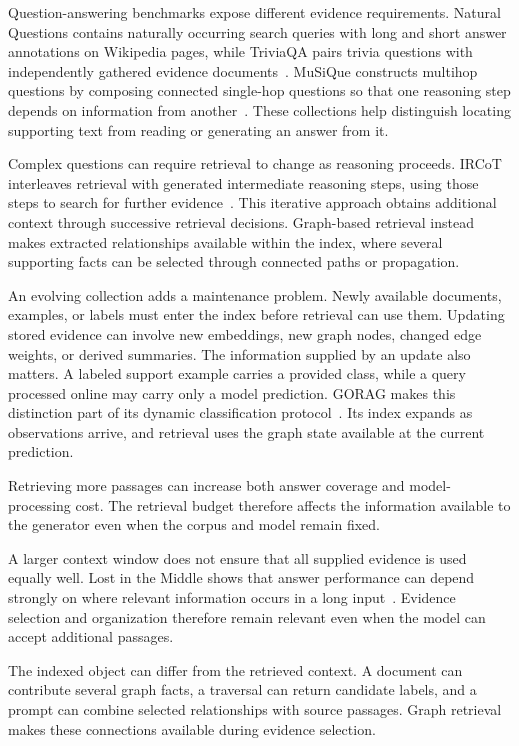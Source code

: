 Question-answering benchmarks expose different evidence requirements. Natural Questions contains naturally occurring search queries with long and short answer annotations on Wikipedia pages, while TriviaQA pairs trivia questions with independently gathered evidence documents~\cite{lit-kwiatkowski2019natural,lit-joshi2017triviaqa}. MuSiQue constructs multihop questions by composing connected single-hop questions so that one reasoning step depends on information from another~\cite{lit-trivedi2022musique}. These collections help distinguish locating supporting text from reading or generating an answer from it.

Complex questions can require retrieval to change as reasoning proceeds. IRCoT interleaves retrieval with generated intermediate reasoning steps, using those steps to search for further evidence~\cite{lit-trivedi2022interleaving}. This iterative approach obtains additional context through successive retrieval decisions. Graph-based retrieval instead makes extracted relationships available within the index, where several supporting facts can be selected through connected paths or propagation.

An evolving collection adds a maintenance problem. Newly available documents, examples, or labels must enter the index before retrieval can use them. Updating stored evidence can involve new embeddings, new graph nodes, changed edge weights, or derived summaries. The information supplied by an update also matters. A labeled support example carries a provided class, while a query processed online may carry only a model prediction. GORAG makes this distinction part of its dynamic classification protocol~\cite{bg-gorag}. Its index expands as observations arrive, and retrieval uses the graph state available at the current prediction.

Retrieving more passages can increase both answer coverage and model-processing cost. The retrieval budget therefore affects the information available to the generator even when the corpus and model remain fixed.

A larger context window does not ensure that all supplied evidence is used equally well. Lost in the Middle shows that answer performance can depend strongly on where relevant information occurs in a long input~\cite{lit-liu2024lost}. Evidence selection and organization therefore remain relevant even when the model can accept additional passages.

The indexed object can differ from the retrieved context. A document can contribute several graph facts, a traversal can return candidate labels, and a prompt can combine selected relationships with source passages. Graph retrieval makes these connections available during evidence selection.

